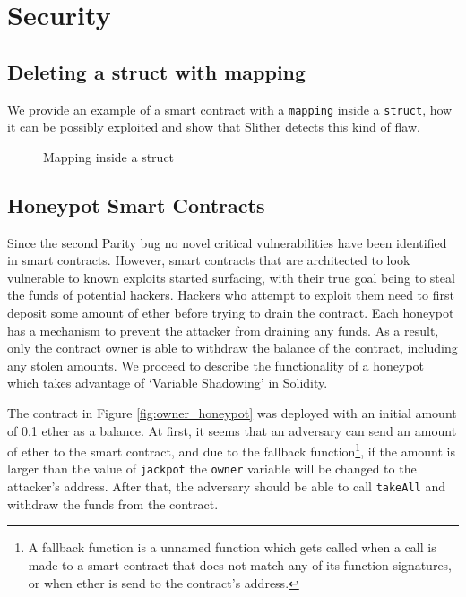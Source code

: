 \chapter{Security}

\section{Deleting a struct with mapping} \label{apx:security:mapping}

We provide an example of a smart contract with a \texttt{mapping} inside a \texttt{struct}, how it can be possibly exploited and show that Slither detects this kind of flaw. 

\begin{figure}[htb]
    \centering
    
    \caption{Mapping inside a struct}
    \label{fig:mapping-struct}
\end{figure}

\section{Honeypot Smart Contracts} \label{honeypots}
Since the second Parity bug no novel critical vulnerabilities have been identified in smart contracts. However, smart contracts that are architected to look vulnerable to known exploits started surfacing, with their true goal being to steal the funds of potential hackers. Hackers who attempt to exploit them need to first deposit some amount of ether before trying to drain the contract. Each honeypot has a mechanism to prevent the attacker from draining any funds. As a result, only the contract owner is able to withdraw the balance of the contract, including any stolen amounts. We proceed to describe the functionality of a honeypot which takes advantage of `Variable Shadowing' in Solidity. 

The contract in Figure \ref{fig:owner_honeypot} was deployed with an initial amount of 0.1 ether as a balance. At first, it seems that an adversary can send an amount of ether to the smart contract, and due to the fallback function\footnote{A fallback function is a unnamed function which gets called when a call is made to a smart contract that does not match any of its function signatures, or when ether is send to the contract's address.}, if the amount is larger than the value of \texttt{jackpot} the \texttt{owner} variable will be changed to the attacker's address. After that, the adversary should be able to call \texttt{takeAll} and withdraw the funds from the contract.

